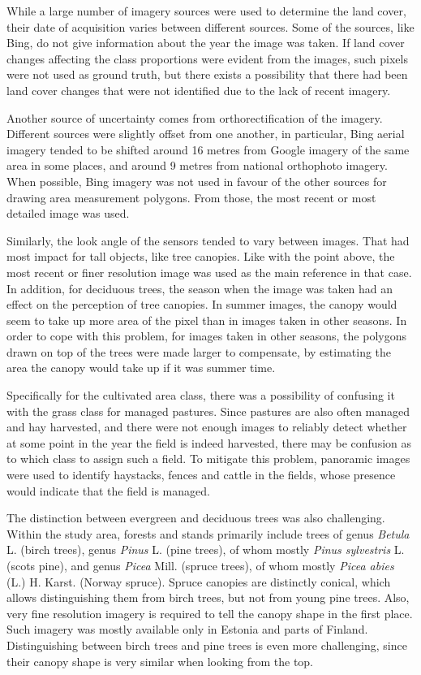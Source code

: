 \documentclass[a4paper,12pt]{scrbook}
\begin{document}
While a large number of imagery sources were used to determine the land cover, their date of acquisition varies between different sources. Some of the sources, like Bing, do not give information about the year the image was taken. If land cover changes affecting the class proportions were evident from the images, such pixels were not used as ground truth, but there exists a possibility that there had been land cover changes that were not identified due to the lack of recent imagery.

Another source of uncertainty comes from orthorectification of the imagery. Different sources were slightly offset from one another, in particular, Bing aerial imagery tended to be shifted around 16 metres from Google imagery of the same area in some places, and around 9 metres from national orthophoto imagery. When possible, Bing imagery was not used in favour of the other sources for drawing area measurement polygons. From those, the most recent or most detailed image was used.

Similarly, the look angle of the sensors tended to vary between images. That had most impact for tall objects, like tree canopies. Like with the point above, the most recent or finer resolution image was used as the main reference in that case. In addition, for deciduous trees, the season when the image was taken had an effect on the perception of tree canopies. In summer images, the canopy would seem to take up more area of the pixel than in images taken in other seasons. In order to cope with this problem, for images taken in other seasons, the polygons drawn on top of the trees were made larger to compensate, by estimating the area the canopy would take up if it was summer time.

Specifically for the cultivated area class, there was a possibility of confusing it with the grass class for managed pastures. Since pastures are also often managed and hay harvested, and there were not enough images to reliably detect whether at some point in the year the field is indeed harvested, there may be confusion as to which class to assign such a field. To mitigate this problem, panoramic images were used to identify haystacks, fences and cattle in the fields, whose presence would indicate that the field is managed.

The distinction between evergreen and deciduous trees was also challenging. Within the study area, forests and stands primarily include trees of genus \textit{Betula} L. (birch trees), genus \textit{Pinus} L. (pine trees), of whom mostly \textit{Pinus sylvestris} L. (scots pine), and genus \textit{Picea} Mill. (spruce trees), of whom mostly \textit{Picea abies} (L.) H. Karst. (Norway spruce). Spruce canopies are distinctly conical, which allows distinguishing them from birch trees, but not from young pine trees. Also, very fine resolution imagery is required to tell the canopy shape in the first place. Such imagery was mostly available only in Estonia and parts of Finland. Distinguishing between birch trees and pine trees is even more challenging, since their canopy shape is very similar when looking from the top.
\end{document}

